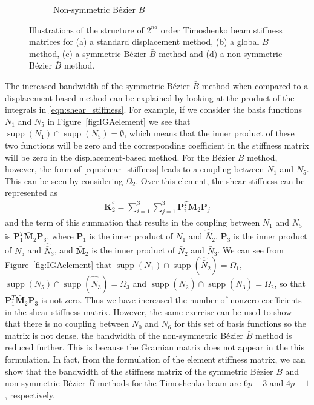 \begin{figure}[!htb]
\begin{subfigure}[b]{0.47\linewidth}
        \caption{Non-symmetric B\'ezier $\bar{B}$}
    \end{subfigure}
    \caption{Illustrations of the structure of $2^{nd}$ order Timoshenko beam stiffness matrices for (a) a standard displacement method, (b) a global $\bar{B}$ method, (c) a symmetric B\'ezier $\bar{B}$ method and (d) a non-symmetric B\'ezier $\bar{B}$ method.}
    \label{fig:stiffness_matrix}
\end{figure}

The increased bandwidth of the {symmetric} B\'ezier $\bar{B}$ method when compared to a displacement-based method can be explained by looking at the product of the integrals in \eqref{eqn:shear_stiffness}. For example, if we consider the basis functions $N_{1}$ and $N_{5}$ in Figure~\ref{fig:IGAelement} we see that $\operatorname{supp}(N_{1}) \cap{} \operatorname{supp}(N_{5}) = \emptyset$, which means that the inner product of these two functions will be zero and the corresponding coefficient in the stiffness matrix will be zero in the displacement-based method. For the B\'ezier $\bar{B}$ method, however, the form of \eqref{eqn:shear_stiffness} leads to a coupling between $N_{1}$ and $N_{5}$. This can be seen by considering $\Omega_2$. Over this element, the shear stiffness can be represented as
\begin{align}
    \bar{\mathbf{K}}^s_2 = \sum_{i=1}^3 \sum_{j=1}^3 \mathbf{P}_i^T\bar{\mathbf{M}}_2\mathbf{P}_j
\end{align}
and the term of this summation that results in the coupling between $N_{1}$ and $N_{5}$ is $\mathbf{P}_1^T\bar{\mathbf{M}}_2\mathbf{P}_3$, where $\mathbf{P}_1$ is the inner product of $N_{1}$ and $\hat{\bar{N}}_{2}$, $\mathbf{P}_3$ is the inner product of $N_{5}$ and $\hat{\bar{N}}_{3}$, and $\bar{\mathbf{M}}_2$ is the inner product of $\bar{N}_{2}$ and $\bar{N}_{3}$. We can see from Figure~\ref{fig:IGAelement} that $\operatorname{supp}(N_{1})\cap{}\operatorname{supp}(\hat{\bar{N}}_{2})=\Omega_1$, $\operatorname{supp}(N_{5})\cap{}\operatorname{supp}(\hat{\bar{N}}_{3})=\Omega_3$ and $\operatorname{supp}(\bar{N}_{2})\cap{}\operatorname{supp}(\bar{N}_{3})=\Omega_2$, so that $\mathbf{P}_1^T\bar{\mathbf{M}}_2\mathbf{P}_3$ is not zero. Thus we have increased the number of nonzero coefficients in the shear stiffness matrix. However, the same exercise can be used to show that there is no coupling between $N_{0}$ and $N_{6}$ for this set of basis functions so the matrix is not dense. {the bandwidth of the non-symmetric B\'ezier $\bar{B}$ method is reduced further. This is because the Gramian matrix does not appear in the this formulation.} In fact, from the formulation of the element stiffness matrix, we can show that the bandwidth of the stiffness matrix of the symmetric B\'ezier $\bar{B}$ and non-symmetric B\'ezier $\bar{B}$ methods for the Timoshenko beam are $6p-3$ and $4p-1$, respectively.

